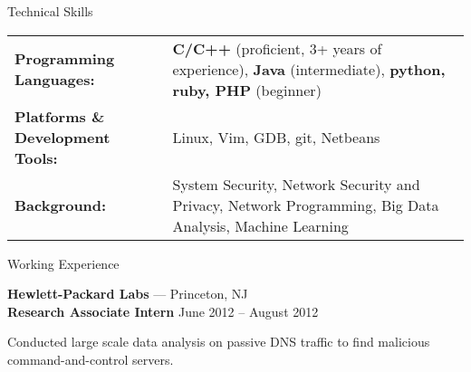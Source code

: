 \documentclass[11pt,oneside]{article}
\newenvironment{ressection_empty}[1]{
	\vspace{-1pt}
	{\fontfamily{phv}\selectfont\Large#1}
	
	\vspace{-8pt} \rule{\textwidth}{.5pt}
}
\newenvironment{ressection}[1]{
	{\fontfamily{phv}\selectfont\Large#1}
	
	\vspace{-8pt} \rule{\textwidth}{.5pt}
	
	\vspace{-4pt}
	\begin{itemize}
	\vspace{.5pt}
}{
	\end{itemize}
}
\newcommand{\resitem}[1]{
	\vspace{2pt}
	\item \begin{flushleft} #1 \end{flushleft}
}
\newcommand{\resbigitem}[3]{
	\vspace{-5pt}
	\item
	\textbf{#1} --- #2 \\
	{#3}
}
\newenvironment{ressubsec}[3]{
	\resbigitem{#1}{#2}{#3}
	\vspace{-4pt}
	\begin{itemize}
}{
	\end{itemize}
}
\begin{document}
\begin{ressection_empty}{Technical Skills}
\vspace{-20pt}
\begin{table}[h]
\begin{tabular}[h]{p{}p{}}

\textbf{Programming Languages:} & \textbf{C/C++} (proficient, 3+ years of experience), \textbf{Java} (intermediate), \textbf{python, ruby, PHP} (beginner)	\\[1.5pt]
\textbf{Platforms \& Development Tools:} & Linux, Vim, GDB, git, Netbeans	\\[1.5pt]
\textbf{Background:} & System Security, Network Security and Privacy, Network Programming, Big Data Analysis, Machine Learning \\
\end{tabular}
\end{table}
\vspace{-8pt}

\begin{comment}
	\resitem{
		\textbf{Programming Languages:} \textbf{C/C++} (proficient, 3+ years of experience), \textbf{Java} (intermediate), \textbf{python, ruby, PHP} (beginner)
	}
	\vspace{-4pt}
	\resitem{
		\textbf{Platforms \& Development Tools:} Linux, Vim, GDB, git, Netbeans
	}
	\vspace{-4pt}
	\resitem{
		\textbf{Background:} System Security, Network Security and Privacy, Network Programming, Big Data Analysis, Machine Learning
	}
\end{comment}


\end{ressection_empty}


\begin{ressection}{Working Experience}
	\begin{ressubsec}{Hewlett-Packard Labs}{Princeton, NJ}{\textbf{Research Associate Intern} \hfill June 2012 -- August 2012}
		\vspace{-2pt}
	\end{ressubsec}
\end{ressection}
\end{document}
